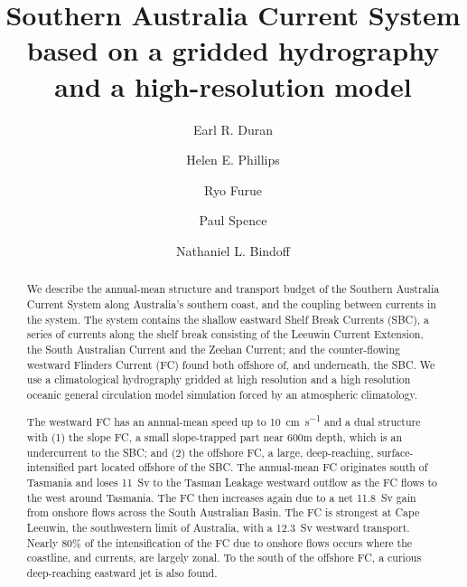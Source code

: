 \documentclass[preprint,3p,review,12pt]{elsarticle}
\begin{document}
\begin{frontmatter}

\title{Southern Australia Current System based on a gridded hydrography and a high-resolution model}

\author[label2]{Earl R. Duran}
\author[label3,label4]{Helen E. Phillips}
\author[label5]{Ryo Furue}
\author[label2,label4]{Paul Spence}
\author[label3,label4,label6,label7]{Nathaniel L. Bindoff}

\address[label2]{Climate Change Research Centre (CCRC), University of New South Wales, Sydney, NSW 2052 Australia}
\address[label3]{Institute for Marine and Antarctic Studies (IMAS), Hobart, Tasmania, Australia}
\address[label4]{ARC Centre of Excellence for Climate Extremes (CLEX)}\address[label5]{Japan Agency for Marine-Earth Science and Technology (JAMSTEC), Yokohama, Japan}
\address[label6]{Commonwealth Scientific and Industrial Research Organisation (CSIRO)}
\address[label7]{Antarctic Climate and Ecosystems Cooperative Research Centre (ACE CRC), Hobart, Tasmania, Australia}


\begin{abstract}
We describe the annual-mean structure and transport budget of the Southern Australia Current System along Australia's southern coast, and the coupling between currents in the system. The system contains the shallow eastward Shelf Break Currents (SBC), a series of currents along the shelf break consisting of the Leeuwin Current Extension, the South Australian Current and the Zeehan Current; and the counter-flowing westward Flinders Current (FC) found both offshore of, and underneath, the SBC\@.
We use a climatological hydrography gridded at high resolution and a high resolution oceanic general circulation model simulation forced by an atmospheric climatology.

The westward FC has an annual-mean speed up to \SI{10}{\centi\meter\per\second} and a dual structure with (1) the slope FC, a small slope-trapped part near 600m depth, which is an undercurrent to the SBC; and (2) the offshore FC, a large, deep-reaching, surface-intensified part located offshore of the SBC\@.
The annual-mean FC originates south of Tasmania and loses \SI{11}{Sv} to the Tasman Leakage westward outflow as the FC flows to the west around Tasmania. The FC then increases again due to a net \SI{11.8}{Sv} gain from onshore flows across the South Australian Basin. The FC is strongest at Cape Leeuwin, the southwestern limit of Australia, with a \SI{12.3}{Sv} westward transport. 
Nearly 80\% of the intensification of the FC due to onshore flows occurs where the coastline, and currents, are largely zonal.
To the south of the offshore FC, a curious deep-reaching eastward jet is also found.


\end{abstract}
\end{frontmatter}
\end{document}
